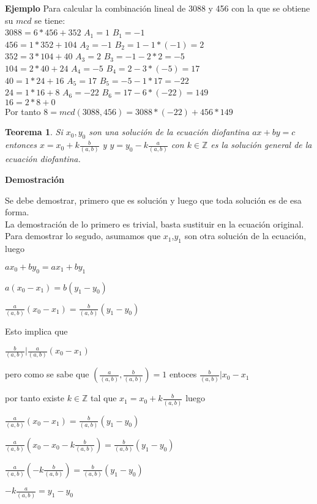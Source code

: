 \documentclass[a4paper,1pt]{report}
\newtheorem*{teo}{Teorema}
\begin{document}
\textbf{Ejemplo}
Para calcular la combinación lineal de 3088 y 456 con la que se obtiene su $mcd$ se tiene:\\
$3088=6*456+352$ $A_1=1$ $B_1=-1$\\
$456=1*352+104$ $A_2=-1$ $B_2=1-1*(-1)=2$\\
$352=3*104+40$ $A_3=2$ $B_3=-1-2*2=-5$\\
$104=2*40+24$ $A_4=-5$ $B_4=2-3*(-5)=17$\\
$40=1*24+16$ $A_5=17$ $B_5=-5-1*17=-22$\\
$24=1*16+8$ $A_6=-22$ $B_6=17-6*(-22)=149$\\
$16=2*8 + 0$\\
Por tanto $8=mcd(3088,456)=3088*(-22)+456*149$

\begin{teo}
 Si $x_0,y_0$ son una solución de la ecuación diofantina $ax+by=c$ entonces 
 $x=x_0+k\frac{b}{(a,b)}$ y $y=y_0-k\frac{a}{(a,b)}$ con $k\in\mathbb{Z}$ es la solución general de la ecuación diofantina.
\end{teo}

\newpage
\textbf{Demostración}

Se debe demostrar, primero que es solución y luego que toda solución es de esa forma.
\\

La demostración de lo primero es trivial, basta sustituir en la ecuación original.
\\

Para demostrar lo segudo, asumamos que $x_1$,$y_1$ son otra solución de la ecuación, luego

$ax_0+by_0=ax_1+by_1$

$a(x_0-x_1)=b(y_1-y_0)$

$\frac{a}{(a,b)}(x_0-x_1)=\frac{b}{(a,b)}(y_1-y_0)$

Esto implica que

$\frac{b}{(a,b)}|\frac{a}{(a,b)}(x_0-x_1)$

pero como se sabe que $(\frac{a}{(a,b)},\frac{b}{(a,b)})=1$ entoces $\frac{b}{(a,b)}|x_0-x_1$

por tanto existe $k\in\mathbb{Z}$ tal que $x_1=x_0 + k\frac{b}{(a,b)}$ luego

$\frac{a}{(a,b)}(x_0-x_1)=\frac{b}{(a,b)}(y_1-y_0)$


$\frac{a}{(a,b)}(x_0- x_0 - k\frac{b}{(a,b)} )=\frac{b}{(a,b)}(y_1-y_0)$

$\frac{a}{(a,b)}(- k\frac{b}{(a,b)} )=\frac{b}{(a,b)}(y_1-y_0)$

$-k\frac{a}{(a,b)}=y_1-y_0$
\end{document}
